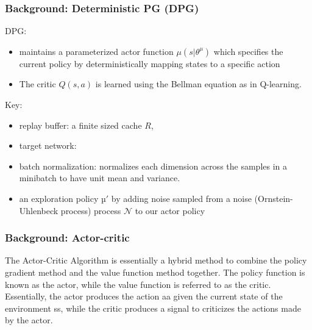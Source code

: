 \begin{frame}
\frametitle{Background: Deterministic PG (DPG) \cite{Silver2014}}

DPG:
\begin{itemize}
  \item maintains a parameterized actor function $\mu (s|\theta^{\mu})$ which
  specifies the current policy by deterministically mapping states to a specific action
  \item The critic $Q(s, a)$ is learned using the Bellman equation as in Q-learning.
\end{itemize}

Key:
\begin{itemize}
  \item replay buffer: a finite sized cache $R$,
  \item target network:
  \item batch normalization: normalizes each dimension across the samples
  in a minibatch to have unit mean and variance.
  \item an exploration policy $µ'$ by adding noise sampled from
  a noise (Ornstein-Uhlenbeck process) process $\mathcal{N}$ to our actor policy
\end{itemize}

\end{frame}

\begin{frame}
\frametitle{Background: Actor-critic \cite{Sutton1998}}
The Actor-Critic Algorithm is essentially a hybrid method to combine the policy gradient method and the value function method together.
The policy function is known as the actor, while the value function is referred to as the critic.
Essentially, the actor produces the action aa given the current state of the environment ss, while the critic produces a signal to criticizes the actions made by the actor.
\end{frame}



